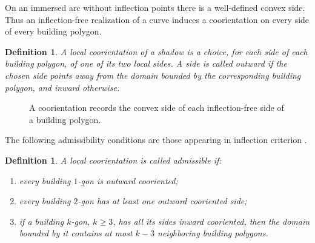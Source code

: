 \documentclass[11pt]{article}
\newtheorem{definition}[theorem]{Definition}
\begin{document}
On an immersed arc without inflection points there is a well-defined convex side.  Thus an inflection-free realization of a curve induces a coorientation on every side of every building polygon.

\begin{definition}
A \emph{local coorientation} of a shadow is a choice, for each side of each building polygon, of one of its two local sides.  A side is called \emph{outward} if the chosen side points away from the domain bounded by the corresponding building polygon, and \emph{inward} otherwise.
\end{definition}

\begin{figure}[t]
\centering
{}
\caption{A coorientation records the convex side of each inflection-free side of a building polygon.}
\label{fig:coorientations}
\end{figure}

The following admissibility conditions are those appearing in inflection criterion \cite{ShapiroTree}.

\begin{definition}\label{def:admissible}
A local coorientation is called \emph{admissible} if:
\begin{enumerate}[label=(\alph*)]
\item every building $1$-gon is outward cooriented;
\item every building $2$-gon has at least one outward cooriented side;
\item if a building $k$-gon, $k\ge 3$, has all its sides inward cooriented, then the domain bounded by it contains at most $k-3$ neighboring building polygons.
\end{enumerate}
\end{definition}
\end{document}
